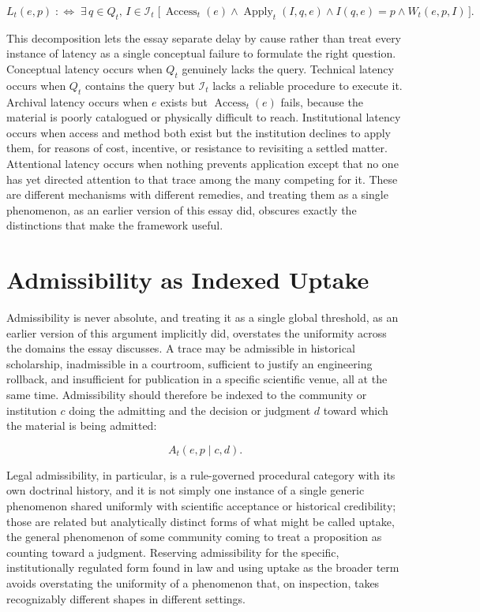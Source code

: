 \documentclass[11pt]{article}
\begin{document}
\[
L_t(e,p) \;:\Leftrightarrow\; \exists\, q \in Q_t,\, I \in \mathcal I_t \;\bigl[\, \operatorname{Access}_t(e) \land \operatorname{Apply}_t(I,q,e) \land I(q,e)=p \land W_t(e,p,I) \,\bigr].
\]

This decomposition lets the essay separate delay by cause rather than treat every instance of latency as a single conceptual failure to formulate the right question. Conceptual latency occurs when $Q_t$ genuinely lacks the query. Technical latency occurs when $Q_t$ contains the query but $\mathcal I_t$ lacks a reliable procedure to execute it. Archival latency occurs when $e$ exists but $\operatorname{Access}_t(e)$ fails, because the material is poorly catalogued or physically difficult to reach. Institutional latency occurs when access and method both exist but the institution declines to apply them, for reasons of cost, incentive, or resistance to revisiting a settled matter. Attentional latency occurs when nothing prevents application except that no one has yet directed attention to that trace among the many competing for it. These are different mechanisms with different remedies, and treating them as a single phenomenon, as an earlier version of this essay did, obscures exactly the distinctions that make the framework useful.

\section{Admissibility as Indexed Uptake}

Admissibility is never absolute, and treating it as a single global threshold, as an earlier version of this argument implicitly did, overstates the uniformity across the domains the essay discusses. A trace may be admissible in historical scholarship, inadmissible in a courtroom, sufficient to justify an engineering rollback, and insufficient for publication in a specific scientific venue, all at the same time. Admissibility should therefore be indexed to the community or institution $c$ doing the admitting and the decision or judgment $d$ toward which the material is being admitted:

\[
A_t(e,p \mid c, d).
\]

Legal admissibility, in particular, is a rule-governed procedural category with its own doctrinal history, and it is not simply one instance of a single generic phenomenon shared uniformly with scientific acceptance or historical credibility; those are related but analytically distinct forms of what might be called uptake, the general phenomenon of some community coming to treat a proposition as counting toward a judgment. Reserving admissibility for the specific, institutionally regulated form found in law and using uptake as the broader term avoids overstating the uniformity of a phenomenon that, on inspection, takes recognizably different shapes in different settings.
\end{document}
